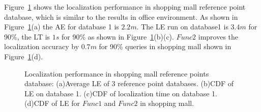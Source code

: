 Figure~\ref{mall_ref_size} shows the localization performance in shopping mall reference point database, which is similar to the results in office environment. As shown in Figure~\ref{mall_ref_size}(a) the AE for database 1 is $2.2m$. The LE run on database1 is $3.4m$ for 90\%, the LT is $1s$ for 90\% as shown in Figure~\ref{mall_ref_size}(b)(c). $Func2$ improves the localization accuracy by $0.7m$ for 90\% queries in shopping mall shown in Figure~\ref{mall_ref_size}(d).
\begin{figure}
\centering
{}
\caption{Localization performance in shopping mall reference points database: (a)Average LE of 3 reference point databases. (b)CDF of LE on database 1. (c)CDF of localization time on database 1.(d)CDF of LE for $Func1$ and $Func2$ in shopping mall.}\label{mall_ref_size}
\end{figure}
